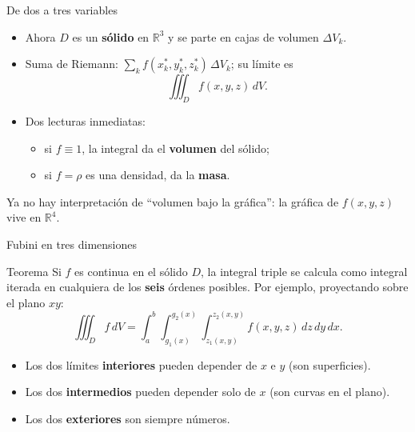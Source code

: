 \documentclass[11pt,aspectratio=169]{beamer}
\begin{document}
\begin{frame}{De dos a tres variables}
  \begin{itemize}
    \item Ahora $D$ es un \textbf{sólido} en $\mathbb R^3$ y se parte en cajas de volumen $\Delta V_k$.
    \pause
    \item Suma de Riemann: $\displaystyle\sum_k f(x_k^*,y_k^*,z_k^*)\,\Delta V_k$; su límite es
    \[
      \iiint_D f(x,y,z)\,dV.
    \]
    \pause
    \item Dos lecturas inmediatas:
    \begin{itemize}
      \item si $f\equiv1$, la integral da el \textbf{volumen} del sólido;
      \item si $f=\rho$ es una densidad, da la \textbf{masa}.
    \end{itemize}
  \end{itemize}
  \vspace{8pt}
  \pause
  \begin{center}\small\color{gray60}
  Ya no hay interpretación de ``volumen bajo la gráfica'': la gráfica de $f(x,y,z)$ vive en $\mathbb R^4$.
  \end{center}
\end{frame}

\begin{frame}{Fubini en tres dimensiones}
  \begin{block}{Teorema}
    Si $f$ es continua en el sólido $D$, la integral triple se calcula como integral iterada en cualquiera de los \textbf{seis} órdenes posibles. Por ejemplo, proyectando sobre el plano $xy$:
    \[
      \iiint_D f\,dV
      = \int_a^b\!\!\int_{g_1(x)}^{g_2(x)}\!\!\int_{z_1(x,y)}^{z_2(x,y)} f(x,y,z)\,dz\,dy\,dx.
    \]
  \end{block}
  \pause
  \begin{itemize}
    \item Los dos límites \textbf{interiores} pueden depender de $x$ e $y$ (son superficies).
    \pause
    \item Los dos \textbf{intermedios} pueden depender solo de $x$ (son curvas en el plano).
    \pause
    \item Los dos \textbf{exteriores} son siempre números.
  \end{itemize}
  \pause
\end{frame}
\end{document}
